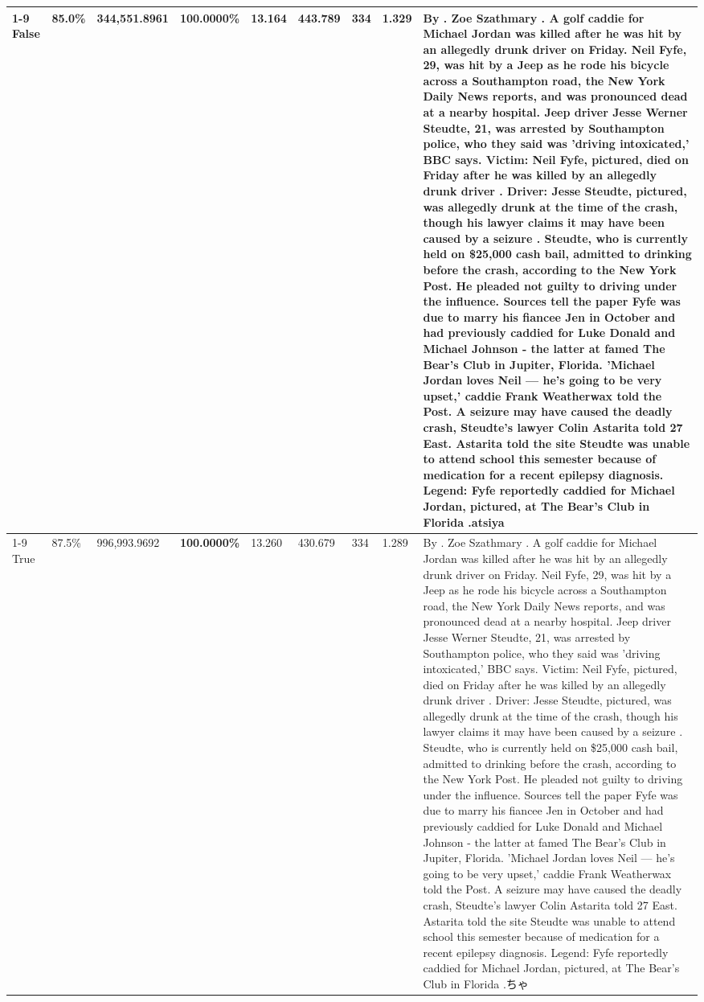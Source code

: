 \begin{table}[H]
\begin{tabular}{lllrlllll}
\cline{1-9}
False & 85.0\% & 344,551.8961 & \bfseries \color{red} 100.0000\% & 13.164 & 443.789 & 334 & 1.329 & By . Zoe Szathmary . A golf caddie for Michael Jordan was killed after he was hit by an allegedly drunk driver on Friday. Neil Fyfe, 29, was hit by a Jeep as he rode his bicycle across a Southampton road, the New York Daily News reports, and was pronounced dead at a nearby hospital. Jeep driver Jesse Werner Steudte, 21, was arrested by Southampton police, who they said was 'driving intoxicated,' BBC says. Victim: Neil Fyfe, pictured, died on Friday after he was killed by an allegedly drunk driver . Driver: Jesse Steudte, pictured, was allegedly drunk at the time of the crash, though his lawyer claims it may have been caused by a seizure . Steudte, who is currently held on \$25,000 cash bail, admitted to drinking before the crash, according to the New York Post. He pleaded not guilty to driving under the influence. Sources tell the paper Fyfe was due to marry his fiancee Jen in October and had previously caddied for Luke Donald and Michael Johnson - the latter at famed The Bear's Club in Jupiter, Florida. 'Michael Jordan loves Neil — he’s going to be very upset,' caddie Frank Weatherwax told the Post. A seizure may have caused the deadly crash, Steudte's lawyer Colin Astarita told 27 East. Astarita told the site Steudte was unable to attend school this semester because of medication for a recent epilepsy diagnosis. Legend: Fyfe reportedly caddied for Michael Jordan, pictured, at The Bear's Club in Florida .atsiya \\
\cline{1-9}
True & 87.5\% & 996,993.9692 & \bfseries \color{red} 100.0000\% & 13.260 & 430.679 & 334 & 1.289 & By . Zoe Szathmary . A golf caddie for Michael Jordan was killed after he was hit by an allegedly drunk driver on Friday. Neil Fyfe, 29, was hit by a Jeep as he rode his bicycle across a Southampton road, the New York Daily News reports, and was pronounced dead at a nearby hospital. Jeep driver Jesse Werner Steudte, 21, was arrested by Southampton police, who they said was 'driving intoxicated,' BBC says. Victim: Neil Fyfe, pictured, died on Friday after he was killed by an allegedly drunk driver . Driver: Jesse Steudte, pictured, was allegedly drunk at the time of the crash, though his lawyer claims it may have been caused by a seizure . Steudte, who is currently held on \$25,000 cash bail, admitted to drinking before the crash, according to the New York Post. He pleaded not guilty to driving under the influence. Sources tell the paper Fyfe was due to marry his fiancee Jen in October and had previously caddied for Luke Donald and Michael Johnson - the latter at famed The Bear's Club in Jupiter, Florida. 'Michael Jordan loves Neil — he’s going to be very upset,' caddie Frank Weatherwax told the Post. A seizure may have caused the deadly crash, Steudte's lawyer Colin Astarita told 27 East. Astarita told the site Steudte was unable to attend school this semester because of medication for a recent epilepsy diagnosis. Legend: Fyfe reportedly caddied for Michael Jordan, pictured, at The Bear's Club in Florida .ちゃ \\

\end{tabular}
\end{table}
